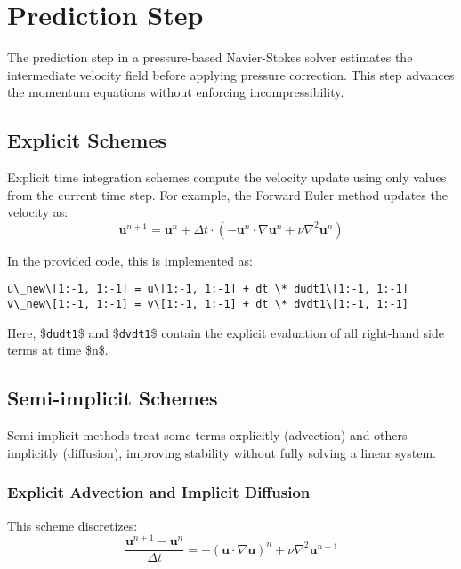 \section{Prediction Step}

The prediction step in a pressure-based Navier-Stokes solver estimates the intermediate velocity field before applying pressure correction. This step advances the momentum equations without enforcing incompressibility.

\subsection{Explicit Schemes}

Explicit time integration schemes compute the velocity update using only values from the current time step. For example, the Forward Euler method updates the velocity as:
\begin{equation}
\mathbf{u}^{n+1} = \mathbf{u}^n + \Delta t \cdot \left( -\mathbf{u}^n \cdot \nabla \mathbf{u}^n + \nu \nabla^2 \mathbf{u}^n \right)
\end{equation}

In the provided code, this is implemented as:
\begin{verbatim}
u\_new\[1:-1, 1:-1] = u\[1:-1, 1:-1] + dt \* dudt1\[1:-1, 1:-1]
v\_new\[1:-1, 1:-1] = v\[1:-1, 1:-1] + dt \* dvdt1\[1:-1, 1:-1]
\end{verbatim}
Here, \$\texttt{dudt1}\$ and \$\texttt{dvdt1}\$ contain the explicit evaluation of all right-hand side terms at time \$n\$.

\subsection{Semi-implicit Schemes}

Semi-implicit methods treat some terms explicitly (advection) and others implicitly (diffusion), improving stability without fully solving a linear system.

\subsubsection{Explicit Advection and Implicit Diffusion}

This scheme discretizes:
\begin{equation}
\frac{\mathbf{u}^{n+1} - \mathbf{u}^n}{\Delta t} = - (\mathbf{u} \cdot \nabla \mathbf{u})^n + \nu \nabla^2 \mathbf{u}^{n+1}
\end{equation}

